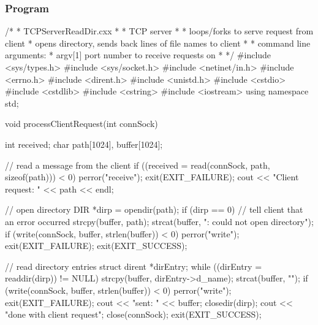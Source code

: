 \documentclass{report}
\begin{document}
    \subsubsection{Program}
    \bigbreak \noindent 
    \begin{cppcode}
    /*
 * TCPServerReadDir.cxx
 * 
 * TCP server
 * 
 * 	loops/forks to serve request from client 
 * 	      opens directory, sends back lines of file names to client
 * 
 * 	command line arguments:
 * 		argv[1] port number to receive requests on
 * 
 */
#include <sys/types.h>
#include <sys/socket.h>
#include <netinet/in.h>
#include <errno.h>
#include <dirent.h>
#include <unistd.h>
#include <cstdio>
#include <cstdlib>
#include <cstring>
#include <iostream>
using namespace std;

void processClientRequest(int connSock) {
	int received;
	char path[1024], buffer[1024];

	// read a message from the client
	if ((received = read(connSock, path, sizeof(path))) < 0) {
		perror("receive");
		exit(EXIT_FAILURE);
	}
	cout << "Client request: " << path << endl;

	// open directory	
	DIR *dirp = opendir(path);
	if (dirp == 0) {
		// tell client that an error occurred
		strcpy(buffer, path);
		strcat(buffer, ": could not open directory\n");
		if (write(connSock, buffer, strlen(buffer)) < 0) {
			perror("write");
		 	exit(EXIT_FAILURE);
		}
		exit(EXIT_SUCCESS);
	}
	
	// read directory entries
	struct dirent *dirEntry;
	while ((dirEntry = readdir(dirp)) != NULL) {
		strcpy(buffer, dirEntry->d_name);
		strcat(buffer, "\n");
		if (write(connSock, buffer, strlen(buffer)) < 0) {
			perror("write");
			exit(EXIT_FAILURE);
		}
		cout << "sent: " << buffer;		
	}	
	closedir(dirp);
	cout << "done with client request\n";
	close(connSock);
	exit(EXIT_SUCCESS);
}
    \end{cppcode}
\end{document}
